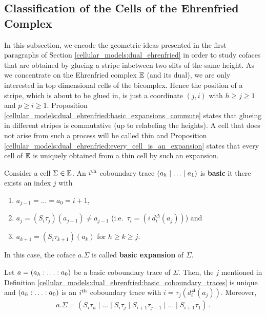 \subsection{Classification of the Cells of the Ehrenfried Complex}
\label{cellular_models:dual_ehrenfried:classification_of_the_cells}
In this subsection, we encode the geometric ideas presented in the first paragraphs of Section \ref{cellular_models:dual_ehrenfried}
in order to study cofaces that are obtained by glueing a stripe inbetween two slits of the same height.
As we concentrate on the Ehrenfried complex $\mathbb E$ (and its dual), we are only interested in top dimensional cells of the bicomplex.
Hence the position of a stripe, which is about to be glued in, is just a coordinate $(j,i)$ with $h \ge j \ge 1$ and $p \ge i \ge 1$.
Proposition \ref{cellular_models:dual_ehrenfried:basic_expansions_commute} states that glueing in different stripes is commutative (up to relabeling the heights).
A cell that does not arise from such a process will be called thin and Proposition \ref{cellular_models:dual_ehrenfried:every_cell_is_an_expansion}
states that every cell of $\mathbb E$ is uniquely obtained from a thin cell by such an expansion.

\begin{defi}
    \label{cellular_models:dual_ehrenfried:basic_coboundary_traces}
    Consider a cell $\Sigma \in \mathbb E$.
    An $i^{\text{th}}$ coboundary trace $\inhom[a]$ is {\bf basic} it there exists an index $j$ with
    \begin{enumerate}
        \item $a_{j-1} = \ldots = a_0 = i+1$,
        \item $a_j = (S_i\tau_j)(a_{j-1}) \neq a_{j-1}$ (i.e.\ $\tau_i = (i\ d^\Delta_i(a_j))$) and
        \item $a_{k+1} = (S_i\tau_{k+1})(a_k)$ for $h \ge k \ge j$.
    \end{enumerate}
    In this case, the coface $a.\Sigma$ is called {\bf basic expansion} of $\Sigma$.
\end{defi}

\begin{lem}
    \label{cellular_models:dual_ehrenfried:basic_coboundary_traces_have_unique_j_and_i}
    Let $a = \homog[a]$ be a basic coboundary trace of $\Sigma$.
    Then, the $j$ mentioned in Definition \ref{cellular_models:dual_ehrenfried:basic_coboundary_traces} is unique and
    $\homog[a]$ is an $i^{\text{th}}$ coboundary trace with $i = \tau_j( d_i^\Delta(a_j) )$.
    Moreover,
    \begin{align}
        \label{cellular_models:dual_ehrenfried:basic_coboundary_trace_applied_to_cell}
        a.\Sigma = (S_i\tau_h \mid \ldots \mid S_i\tau_j \mid S_{i+1}\tau_{j-1} \mid \ldots \mid S_{i+1}\tau_1) \,.
    \end{align}

\end{lem}

